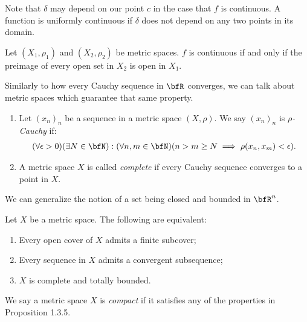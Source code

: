     Note that $\delta$ may depend on our point $c$ in the case that $f$ is continuous. A function is uniformly continuous if $\delta$ does not depend on any two points in its domain.

    \begin{proposition}
        Let $(X_1,\rho_1)$ and $(X_2,\rho_2)$ be metric spaces. $f$ is continuous if and only if the preimage of every open set in $X_2$ is open in $X_1$.
    \end{proposition}

    Similarly to how every Cauchy sequence in $\bfR$ converges, we can talk about metric spaces which guarantee that same property.

    \begin{definition}
        \phantom{a}
        \begin{enumerate}[label = (\arabic*),itemsep=1pt,topsep=3pt]
            \item Let $(x_n)_n$ be a sequence in a metric space $(X,\rho)$. We say $(x_n)_n$ is \textit{$\rho$-Cauchy} if:
                \begin{equation*}
                \begin{split}
                    (\forall \epsilon > 0)(\exists N \in \bfN):(\forall n,m \in \bfN)(n > m \geq N \implies \rho(x_n,x_m) < \epsilon).
                \end{split}
                \end{equation*}
            \item A metric space $X$ is called \textit{complete} if every Cauchy sequence converges to a point in $X$.
        \end{enumerate}
    \end{definition}

    We can generalize the notion of a set being closed and bounded in $\bfR^n$.

    \begin{proposition}
        Let $X$ be a metric space. The following are equivalent:
            \begin{enumerate}[label = (\arabic*),itemsep=1pt,topsep=3pt]
                \item Every open cover of $X$ admits a finite subcover;
                \item Every sequence in $X$ admits a convergent subsequence;
                \item $X$ is complete and totally bounded.
            \end{enumerate}
    \end{proposition}

    \begin{definition}
        We say a metric space $X$ is \textit{compact} if it satisfies any of the properties in Proposition 1.3.5.
    \end{definition}

    


